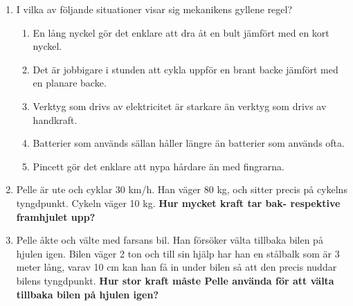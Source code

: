 \documentclass[11pt]{article}
\begin{document}
\begin{enumerate}[itemsep=2em]
        \item
              I vilka av följande situationer visar sig mekanikens gyllene regel?
              \begin{enumerate}[label=\textbf{\alph*.}]
                      \item En lång nyckel gör det enklare att dra åt en bult jämfört med en kort nyckel.
                      \item Det är jobbigare i stunden att cykla uppför en brant backe jämfört med en planare backe.
                      \item Verktyg som drivs av elektricitet är starkare än verktyg som drivs av handkraft.
                      \item Batterier som används sällan håller längre än batterier som används ofta.
                      \item Pincett gör det enklare att nypa hårdare än med fingrarna.
              \end{enumerate}

        \item
              \begin{minipage}[t]{0.5\textwidth}
                      Pelle är ute och cyklar 30 km/h. Han väger 80 kg, och sitter precis på cykelns tyngdpunkt. Cykeln väger 10 kg. \textbf{Hur mycket kraft tar bak- respektive framhjulet upp?}
              \end{minipage}
              \hspace{1em}
              \begin{adjustbox}{valign=t}
                      
              \end{adjustbox}

        \item
              Pelle åkte och välte med farsans bil. Han försöker välta tillbaka bilen på hjulen igen. Bilen väger 2 ton och till sin hjälp har han en stålbalk som är 3 meter lång, varav 10 cm kan han få in under bilen så att den precis nuddar bilens tyngdpunkt. \textbf{Hur stor kraft måste Pelle använda för att välta tillbaka bilen på hjulen igen?}
              \begin{center}
                      
              \end{center}


\end{enumerate}
\end{document}
